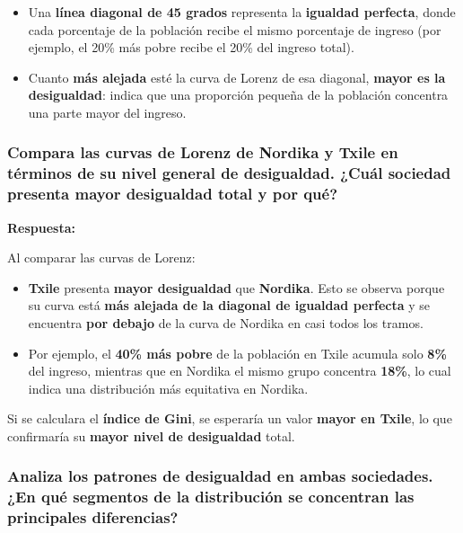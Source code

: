 \documentclass[
]{article}
\begin{document}
\begin{itemize}
\item
  Una \textbf{línea diagonal de 45 grados} representa la
  \textbf{igualdad perfecta}, donde cada porcentaje de la población
  recibe el mismo porcentaje de ingreso (por ejemplo, el 20\% más pobre
  recibe el 20\% del ingreso total).
\item
  Cuanto \textbf{más alejada} esté la curva de Lorenz de esa diagonal,
  \textbf{mayor es la desigualdad}: indica que una proporción pequeña de
  la población concentra una parte mayor del ingreso.
\end{itemize}

\subsubsection{Compara las curvas de Lorenz de Nordika y Txile en
términos de su nivel general de desigualdad. ¿Cuál sociedad presenta
mayor desigualdad total y por
qué?}\label{compara-las-curvas-de-lorenz-de-nordika-y-txile-en-tuxe9rminos-de-su-nivel-general-de-desigualdad.-cuuxe1l-sociedad-presenta-mayor-desigualdad-total-y-por-quuxe9}

\textbf{Respuesta:}

Al comparar las curvas de Lorenz:

\begin{itemize}
\item
  \textbf{Txile} presenta \textbf{mayor desigualdad} que
  \textbf{Nordika}. Esto se observa porque su curva está \textbf{más
  alejada de la diagonal de igualdad perfecta} y se encuentra
  \textbf{por debajo} de la curva de Nordika en casi todos los tramos.
\item
  Por ejemplo, el \textbf{40\% más pobre} de la población en Txile
  acumula solo \textbf{8\%} del ingreso, mientras que en Nordika el
  mismo grupo concentra \textbf{18\%}, lo cual indica una distribución
  más equitativa en Nordika.
\end{itemize}

Si se calculara el \textbf{índice de Gini}, se esperaría un valor
\textbf{mayor en Txile}, lo que confirmaría su \textbf{mayor nivel de
desigualdad} total.

\subsubsection{Analiza los patrones de desigualdad en ambas sociedades.
¿En qué segmentos de la distribución se concentran las principales
diferencias?}\label{analiza-los-patrones-de-desigualdad-en-ambas-sociedades.-en-quuxe9-segmentos-de-la-distribuciuxf3n-se-concentran-las-principales-diferencias}
\end{document}
